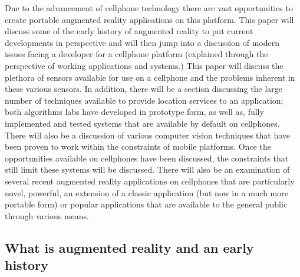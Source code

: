 \documentclass{acm_proc_article-sp}
\begin{document}
Due to the advancement of cellphone technology there are vast opportunities to create portable augmented reality applications on this platform.  This paper will discuss some of the early history of augmented reality to put current developments in perspective and will then jump into a discussion of modern issues facing a developer for a cellphone platform (explained through the perspective of working applications and systems.)  This paper will discuss the plethora of sensors available for use on a cellphone and the problems inherent in these various sensors.  In addition, there will be a section discussing the large number of techniques available to provide location services to an application; both algorithms labs have developed in prototype form, as well as, fully implemented and tested systems that are available by default on cellphones. There will also be a discussion of various computer vision techniques that have been proven to work within the constraints of mobile platforms.  Once the opportunities available on cellphones have been discussed, the constraints that still limit these systems will be discussed. There will also be an examination of several recent augmented reality applications on cellphones that are particularly novel, powerful, an extension of a classic application (but now in a much more portable form) or popular applications that are available to the general public through various means.

\subsection{What is augmented reality and an early history}
\end{document}
